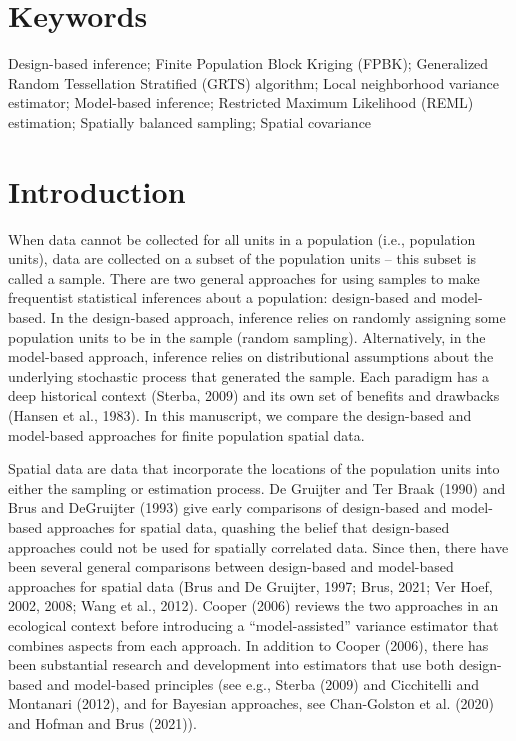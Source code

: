 \documentclass[]{elsarticle} %
\begin{document}
\hypertarget{keywords}{%
\section*{Keywords}\label{keywords}}

Design-based inference; Finite Population Block Kriging (FPBK);
Generalized Random Tessellation Stratified (GRTS) algorithm; Local
neighborhood variance estimator; Model-based inference; Restricted
Maximum Likelihood (REML) estimation; Spatially balanced sampling;
Spatial covariance

\hypertarget{sec:introduction}{%
\section{Introduction}\label{sec:introduction}}

When data cannot be collected for all units in a population (i.e.,
population units), data are collected on a subset of the population
units -- this subset is called a sample. There are two general
approaches for using samples to make frequentist statistical inferences
about a population: design-based and model-based. In the design-based
approach, inference relies on randomly assigning some population units
to be in the sample (random sampling). Alternatively, in the model-based
approach, inference relies on distributional assumptions about the
underlying stochastic process that generated the sample. Each paradigm
has a deep historical context (Sterba, 2009) and its own set of benefits
and drawbacks (Hansen et al., 1983). In this manuscript, we compare the
design-based and model-based approaches for finite population spatial
data.

Spatial data are data that incorporate the locations of the population
units into either the sampling or estimation process. De Gruijter and
Ter Braak (1990) and Brus and DeGruijter (1993) give early comparisons
of design-based and model-based approaches for spatial data, quashing
the belief that design-based approaches could not be used for spatially
correlated data. Since then, there have been several general comparisons
between design-based and model-based approaches for spatial data (Brus
and De Gruijter, 1997; Brus, 2021; Ver Hoef, 2002, 2008; Wang et al.,
2012). Cooper (2006) reviews the two approaches in an ecological context
before introducing a ``model-assisted'' variance estimator that combines
aspects from each approach. In addition to Cooper (2006), there has been
substantial research and development into estimators that use both
design-based and model-based principles (see e.g., Sterba (2009) and
Cicchitelli and Montanari (2012), and for Bayesian approaches, see
Chan-Golston et al. (2020) and Hofman and Brus (2021)).
\end{document}
